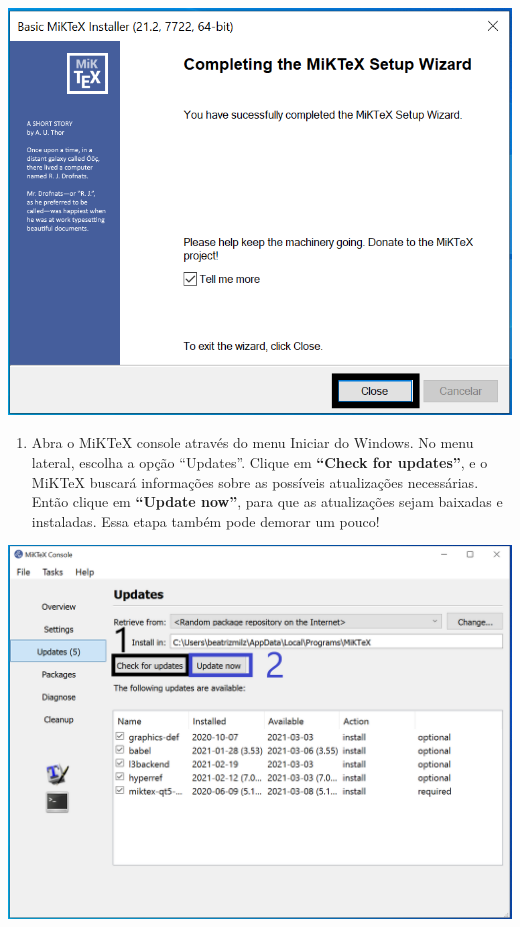 \documentclass[
]{book}
\providecommand{\tightlist}{%
  \setlength{\itemsep}{0pt}\setlength{\parskip}{0pt}}
\begin{document}
\begin{center}\includegraphics[width=0.8\linewidth]{img/instalacao/miktex_windows/win_miktex8} \end{center}

\begin{enumerate}
\def\labelenumi{\arabic{enumi}.}
\setcounter{enumi}{9}
\tightlist
\item
  Abra o MiKTeX console através do menu Iniciar do Windows. No menu lateral, escolha a opção ``Updates''. Clique em \textbf{``Check for updates''}, e o MiKTeX buscará informações sobre as possíveis atualizações necessárias. Então clique em \textbf{``Update now''}, para que as atualizações sejam baixadas e instaladas. Essa etapa também pode demorar um pouco!
\end{enumerate}

\begin{center}\includegraphics[width=0.8\linewidth]{img/instalacao/miktex_windows/win_miktex9} \end{center}
\end{document}
